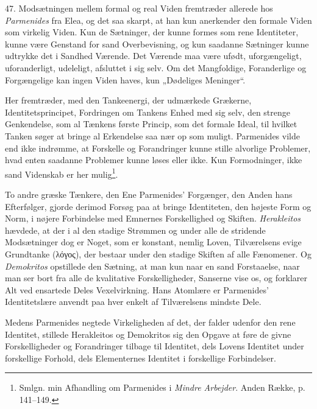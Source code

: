 \documentclass[12pt,a4paper]{book}
\newcommand{\apage}[1]{\marginnote{\footnotesize\textit{[#1]}}}
\begin{document}
47. Modsætningen mellem formal og real Viden fremtræder allerede hos
\emph{Parmenides} fra Elea, og det saa skarpt, at han kun anerkender den
formale Viden som virkelig Viden. Kun de Sætninger, der kunne formes som
rene Identiteter, kunne være Genstand for sand Overbevisning, og kun
saadanne Sætninger kunne udtrykke det i Sandhed Værende. Det Værende maa
være ufødt, uforgængeligt, uforanderligt, udeleligt, afsluttet i sig
selv. Om det Mangfoldige, Foranderlige og Forgængelige kan ingen Viden
haves, kun „Dødeliges Meninger“.

Her fremtræder, med den Tankeenergi, der udmærkede Grækerne,
Identitetsprincipet, Fordringen om Tankens Enhed med sig selv, den
strenge Genkendelse, som al Tænkens første Princip, som det formale
Ideal, til hvilket Tanken søger at bringe al Erkendelse saa nær op som
muligt. Parmenides vilde end ikke indrømme, at Forskelle og Forandringer
kunne stille alvorlige Problemer, hvad enten saadanne Problemer kunne
løses eller ikke. Kun Formodninger, ikke sand Videnskab er her
mulig\footnote{Smlgn. min Afhandling om Parmenides i \emph{Mindre
Arbejder}. Anden Række, p. 141--149.}.

To andre græske Tænkere, den Ene Parmenides' Forgænger, den Anden hans
Efterfølger, gjorde derimod Forsøg paa at bringe Identiteten, den højeste
Form og Norm, i nøjere Forbindelse med Emnernes Forskellighed og Skiften.
\emph{Herakleitos} hævdede, at der i al den stadige Strømmen og under
alle de stridende Modsætninger dog er Noget, som er konstant, nemlig
Loven, Tilværelsens evige Grundtanke \apage{125} (λόγος), der bestaar under den
stadige Skiften af alle Fænomener. Og \emph{Demokritos} opstillede den
Sætning, at man kun naar en sand Forstaaelse, naar man ser bort fra alle
de kvalitative Forskelligheder, Sanserne vise os, og forklarer Alt ved
ensartede Deles Vexelvirkning. Hans Atomlære er Parmenides' Identitetslære
anvendt paa hver enkelt af Tilværelsens mindste Dele.

Medens Parmenides negtede Virkeligheden af det, der falder udenfor den
rene Identitet, stillede Herakleitos og Demokritos sig den Opgave at føre
de givne Forskelligheder og Forandringer tilbage til Identitet, dels
Lovens Identitet under forskellige Forhold, dels Elementernes Identitet i
forskellige Forbindelser.
\end{document}
